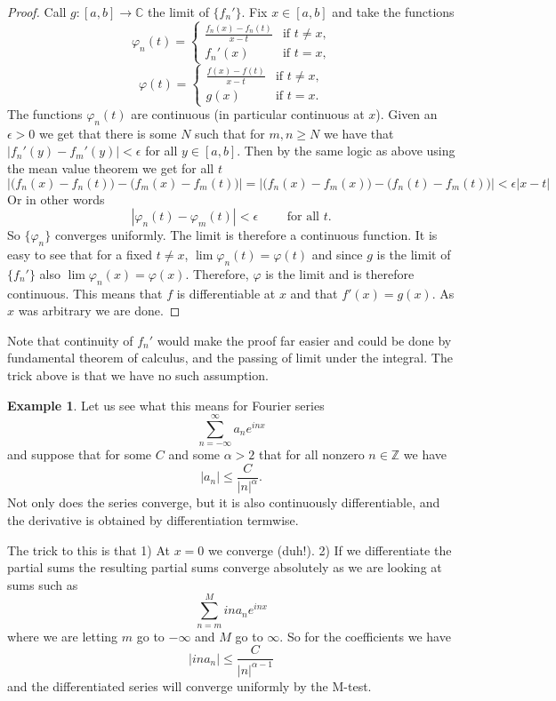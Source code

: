 \documentclass[12pt]{book}
\newcommand{\abs}[1]{\left\lvert {#1} \right\rvert}
\newcommand{\C}{{\mathbb{C}}}
\newcommand{\Z}{{\mathbb{Z}}}
\theoremstyle{plain}
\theoremstyle{remark}
\theoremstyle{definition}
\theoremstyle{exercise}
\theoremstyle{example}
\newtheorem{example}[thm]{Example}
\begin{document}
\begin{proof}
Call $g \colon [a,b] \to \C$ the limit of $\{ f_n' \}$. 
Fix $x \in [a,b]$ and take the functions
$$
\varphi_n(t) =
\begin{cases}
\frac{f_n(x)-f_n(t)}{x-t} & \text{if $t \not= x$,}\\
f_n'(x) & \text{if $t = x$,}
\end{cases}
$$
$$
\varphi(t) =
\begin{cases}
\frac{f(x)-f(t)}{x-t} & \text{if $t \not= x$,}\\
g(x) & \text{if $t = x$.}
\end{cases}
$$
The functions $\varphi_n(t)$ are continuous (in particular continuous at $x$).
Given an $\epsilon > 0$ we get that
there is some $N$ such that for $m,n \geq N$ we have that
$\abs{f_n'(y) - f_m'(y)} < \epsilon$ for all $y \in [a,b]$.
Then by the same logic as above
using the mean value theorem we get for all $t$
\begin{equation*}
\abs{\bigl(f_n(x)-f_n(t)\bigr) - \bigl(f_m(x)-f_m(t)\bigr)} = 
\abs{\bigl(f_n(x)-f_m(x)\bigr) - \bigl(f_n(t)-f_m(t)\bigr)}
<
\epsilon \abs{x-t}
\end{equation*}
Or in other words
$$
\abs{\varphi_n(t) - \varphi_m(t)} < \epsilon \qquad \text{ for all $t$}.
$$
So $\{ \varphi_n \}$ converges uniformly.  The limit is therefore
a continuous function.  It is easy to see that for a fixed $t \not= x$,
$\lim \varphi_n(t) = \varphi(t)$ and since $g$ is the limit of $\{ f_n' \}$
also $\lim \varphi_n(x) = \varphi(x)$.  Therefore, $\varphi$ is the limit
and is therefore continuous.  This means that $f$ is differentiable at $x$
and that $f'(x) = g(x)$.  As $x$ was arbitrary we are done.
\end{proof}

\medskip

Note that continuity of $f_n'$ would make the proof far easier and could be
done by fundamental theorem of calculus, and the passing of limit under the
integral.  The trick above is that we have no
such assumption.


\begin{example}
Let us see what this means for Fourier series
$$
\sum_{n=-\infty}^\infty
a_n e^{inx}
$$
and suppose that for some $C$ and some $\alpha > 2$ that for all nonzero $n \in \Z$ we have
$$
\abs{a_n} \leq \frac{C}{\abs{n}^\alpha} .
$$
Not only does the series converge, but it is also
continuously differentiable, and the derivative is obtained by 
differentiation termwise.

The trick to this is that 1) At $x=0$ we converge (duh!).  2) If we
differentiate the partial sums the resulting partial sums converge
absolutely as we are looking at sums such as
$$
\sum_{n=m}^{M}
i n a_n e^{inx}
$$
where we are letting $m$ go to $-\infty$ and $M$ go to $\infty$.
So for the coefficients we have $$\abs{ina_n} \leq \frac{C}{\abs{n}^{\alpha-1}}$$ and
the differentiated series will converge uniformly by the M-test.
\end{example}
\end{document}
